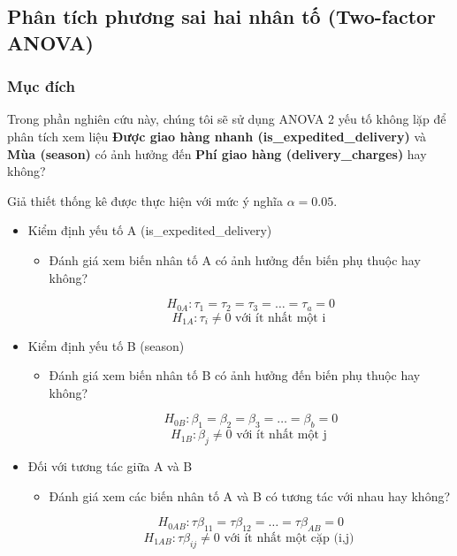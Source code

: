 
\subsection{Phân tích phương sai hai nhân tố (Two-factor ANOVA)}
\subsubsection{Mục đích}
Trong phần nghiên cứu này, chúng tôi sẽ sử dụng ANOVA 2 yếu tố không lặp để phân tích xem liệu \textbf{Được giao hàng nhanh (is\_expedited\_delivery)} và \textbf{Mùa (season)} có ảnh hưởng đến \textbf{Phí giao hàng (delivery\_charges)} hay không?

Giả thiết thống kê được thực hiện với mức ý nghĩa $\alpha = 0.05$.


\begin{itemize}
    
    \item Kiểm định yếu tố A (is\_expedited\_delivery)
    \begin{itemize}
        \item Đánh giá xem biến nhân tố A có ảnh hưởng đến biến phụ thuộc hay không?
        
        \[
            H_{0A}: \tau_{1} = \tau_{2} = \tau_{3} = \dots = \tau_{a} = 0
            \]
            \[
            H_{1A}: \tau_{i} \neq  0 \text{ với ít nhất một i }
            \]
    \end{itemize}
    
    \item Kiểm định yếu tố B (season)
    \begin{itemize}
        \item Đánh giá xem biến nhân tố B có ảnh hưởng đến biến phụ thuộc hay không?
        
        \[
            H_{0B}: \beta_{1} = \beta_{2} = \beta_{3} = \dots = \beta_{b} = 0
            \]
            \[
            H_{1B}: \beta_{j} \neq  0 \text{ với ít nhất một j }
            \]
    \end{itemize}
    \item Đối với tương tác giữa A và B  
    \begin{itemize}
        \item Đánh giá xem các biến nhân tố A và B có tương tác với nhau hay không?
        
        \[
            H_{0AB}: \tau\beta_{11} = \tau\beta_{12}  = \dots = \tau\beta_{AB} = 0 
            \]
            \[
            H_{1AB}: \tau\beta_{ij} \neq  0 \text{ với ít nhất một cặp (i,j) }
            \]
    \end{itemize}
\end{itemize}

